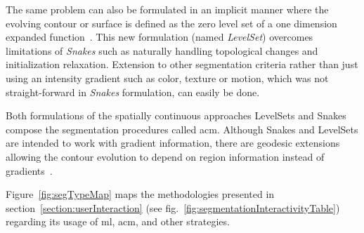 \documentclass[authoryear,preprint,review,12pt]{elsarticle}
\begin{document}
The same problem can also be formulated in an implicit manner where the evolving contour or surface is defined as the zero level set of a one dimension expanded function~\cite{osher2003level}. This new formulation (named \emph{LevelSet}) overcomes limitations of \emph{Snakes} such as naturally handling topological changes and initialization relaxation. Extension to other segmentation criteria rather than just using an intensity gradient such as color, texture or motion, which was not straight-forward in \emph{Snakes} formulation, can easily be done.

Both formulations of the spatially continuous approaches LevelSets and Snakes compose the segmentation procedures called \ac{acm}. Although Snakes and LevelSets are intended to work with gradient information, there are geodesic extensions allowing the contour evolution to depend on region information instead of gradients~\cite{Liu:2010p14328}.

Figure~\ref{fig:segTypeMap} maps the methodologies presented in section~\ref{section:userInteraction} (see fig.~\ref{fig:segmentationInteractivityTable}) regarding its usage of \ac{ml}, \ac{acm}, and other strategies.
\end{document}
